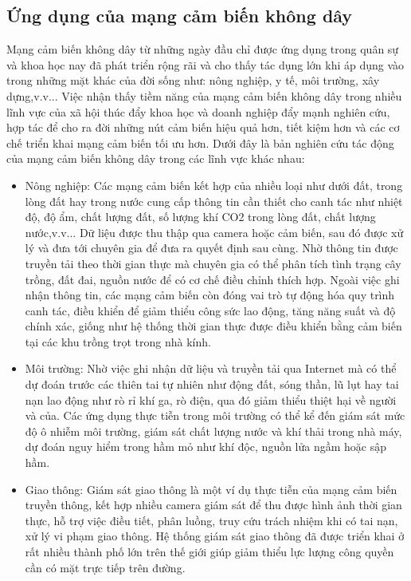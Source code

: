 \subsection{Ứng dụng của mạng cảm biến không dây}
Mạng cảm biến không dây từ những ngày đầu chỉ được ứng dụng trong quân sự và khoa học nay đã phát triển rộng rãi và cho thấy tác dụng lớn khi áp dụng vào trong những mặt khác của đời sống như: nông nghiệp, y tế, môi trường, xây dựng,v.v... Việc nhận thấy tiềm năng của mạng cảm biến không dây trong nhiều lĩnh vực của xã hội thúc đẩy khoa học và doanh nghiệp đẩy mạnh nghiên cứu, hợp tác để cho ra đời những nút cảm biến hiệu quả hơn, tiết kiệm hơn và các cơ chế triển khai mạng cảm biến tối ưu hơn. Dưới đây là bản nghiên cứu tác động của mạng cảm biến không dây trong các lĩnh vực khác nhau:\cite{wsn_applications}
\begin{itemize}
\item Nông nghiệp: Các mạng cảm biến kết hợp của nhiều loại như dưới đất, trong lòng đất hay trong nước cung cấp thông tin cần thiết cho canh tác như nhiệt độ, độ ẩm, chất lượng đất, số lượng khí CO2 trong lòng đất, chất lượng nước,v.v... Dữ liệu được thu thập qua camera hoặc cảm biến, sau đó được xử lý và đưa tới chuyên gia để đưa ra quyết định sau cùng. Nhờ thông tin được truyền tải theo thời gian thực mà chuyên gia có thể phân tích tình trạng cây trồng, đất đai, nguồn nước để có cơ chế điều chỉnh thích hợp. Ngoài việc ghi nhận thông tin, các mạng cảm biến còn đóng vai trò tự động hóa quy trình canh tác, điều khiển để giảm thiểu công sức lao động, tăng năng suất và độ chính xác, giống như hệ thống thời gian thực được điều khiển bằng cảm biến tại các khu trồng trọt trong nhà kính.
\item Môi trường: Nhờ việc ghi nhận dữ liệu và truyền tải qua Internet mà có thể dự đoán trước các thiên tai tự nhiên như động đất, sóng thần, lũ lụt hay tai nạn lao động như rò rỉ khí ga, rò điện, qua đó giảm thiểu thiệt hại về người và của. Các ứng dụng thực tiễn trong môi trường có thể kể đến giám sát mức độ ô nhiễm môi trường, giám sát chất lượng nước và khí thải trong nhà máy, dự đoán nguy hiểm trong hầm mỏ như khí độc, nguồn lửa ngầm hoặc sập hầm. 
\item Giao thông: Giám sát giao thông là một ví dụ thực tiễn của mạng cảm biến truyền thông, kết hợp nhiều camera giám sát để thu được hình ảnh thời gian thực, hỗ trợ việc điều tiết, phân luồng, truy cứu trách nhiệm khi có tai nạn, xử lý vi phạm giao thông. Hệ thống giám sát giao thông đã được triển khai ở rất nhiều thành phố lớn trên thế giới giúp giảm thiểu lực lượng công quyền cần có mặt trực tiếp trên đường. 

\end{itemize}
